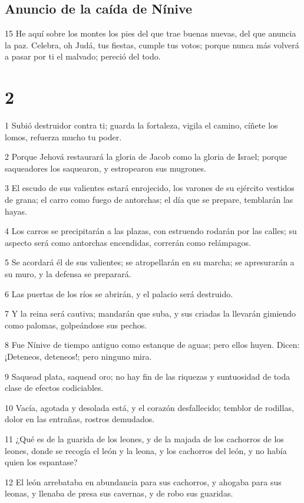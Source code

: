 \section*{Anuncio de la caída de Nínive}

\par 15 He aquí sobre los montes los pies del que trae buenas nuevas, del que anuncia la paz. Celebra, oh Judá, tus fiestas, cumple tus votos; porque nunca más volverá a pasar por ti el malvado; pereció del todo.

\chapter{2}

\par 1 Subió destruidor contra ti; guarda la fortaleza, vigila el camino, cíñete los lomos, refuerza mucho tu poder.
\par 2 Porque Jehová restaurará la gloria de Jacob como la gloria de Israel; porque saqueadores los saquearon, y estropearon sus mugrones.
\par 3 El escudo de sus valientes estará enrojecido, los varones de su ejército vestidos de grana; el carro como fuego de antorchas; el día que se prepare, temblarán las hayas.
\par 4 Los carros se precipitarán a las plazas, con estruendo rodarán por las calles; su aspecto será como antorchas encendidas, correrán como relámpagos.
\par 5 Se acordará él de sus valientes; se atropellarán en su marcha; se apresurarán a su muro, y la defensa se preparará.
\par 6 Las puertas de los ríos se abrirán, y el palacio será destruido.
\par 7 Y la reina será cautiva; mandarán que suba, y sus criadas la llevarán gimiendo como palomas, golpeándose sus pechos.
\par 8 Fue Nínive de tiempo antiguo como estanque de aguas; pero ellos huyen. Dicen: ¡Deteneos, deteneos!; pero ninguno mira.
\par 9 Saquead plata, saquead oro; no hay fin de las riquezas y suntuosidad de toda clase de efectos codiciables.
\par 10 Vacía, agotada y desolada está, y el corazón desfallecido; temblor de rodillas, dolor en las entrañas, rostros demudados.
\par 11 ¿Qué es de la guarida de los leones, y de la majada de los cachorros de los leones, donde se recogía el león y la leona, y los cachorros del león, y no había quien los espantase?
\par 12 El león arrebataba en abundancia para sus cachorros, y ahogaba para sus leonas, y llenaba de presa sus cavernas, y de robo sus guaridas.

